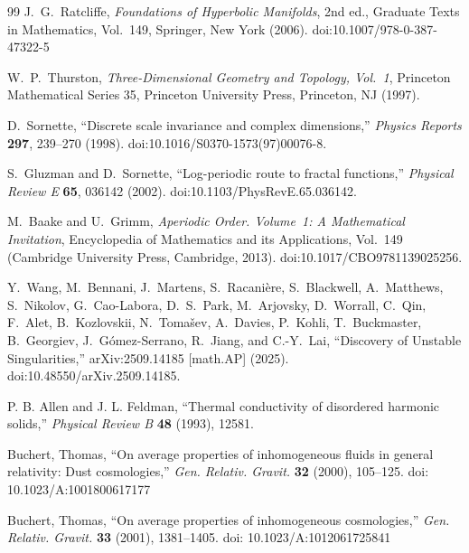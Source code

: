 \documentclass[10pt,reprint,aps,onecolumn,nofootinbib]{revtex4-2}
\begin{document}
\begin{thebibliography}{99}
    J.~G.~Ratcliffe,
    \textit{Foundations of Hyperbolic Manifolds}, 2nd ed.,
    Graduate Texts in Mathematics, Vol.~149,
    Springer, New York (2006).
    doi:10.1007/978-0-387-47322-5

    W.~P.~Thurston,
    \textit{Three-Dimensional Geometry and Topology, Vol.~1},
    Princeton Mathematical Series 35,
    Princeton University Press, Princeton, NJ (1997).

    D.~Sornette,
    ``Discrete scale invariance and complex dimensions,''
    \emph{Physics Reports} \textbf{297}, 239--270 (1998).
    doi:10.1016/S0370-1573(97)00076-8.

    S.~Gluzman and D.~Sornette,
    ``Log-periodic route to fractal functions,''
    \emph{Physical Review E} \textbf{65}, 036142 (2002).
    doi:10.1103/PhysRevE.65.036142.

    M.~Baake and U.~Grimm,
    \emph{Aperiodic Order. Volume~1: A Mathematical Invitation},
    Encyclopedia of Mathematics and its Applications, Vol.~149
    (Cambridge University Press, Cambridge, 2013).
    doi:10.1017/CBO9781139025256.

    Y.~Wang, M.~Bennani, J.~Martens, S.~Racani\`ere, S.~Blackwell,
    A.~Matthews, S.~Nikolov, G.~Cao-Labora, D.~S.~Park, M.~Arjovsky,
    D.~Worrall, C.~Qin, F.~Alet, B.~Kozlovskii, N.~Toma\v{s}ev,
    A.~Davies, P.~Kohli, T.~Buckmaster, B.~Georgiev, J.~G\'omez-Serrano,
    R.~Jiang, and C.-Y.~Lai,
    ``Discovery of Unstable Singularities,''
    arXiv:2509.14185 [math.AP] (2025).
    doi:10.48550/arXiv.2509.14185.


    P. B. Allen and J. L. Feldman,
    ``Thermal conductivity of disordered harmonic solids,''
    \textit{Physical Review B}
    \textbf{48}
    (1993), 12581.


    Buchert, Thomas,
    ``On average properties of inhomogeneous fluids in general relativity: Dust cosmologies,''
    \textit{Gen. Relativ. Gravit.}
    \textbf{32}
    (2000), 105--125.
    doi: 10.1023/A:1001800617177

    Buchert, Thomas,
    ``On average properties of inhomogeneous cosmologies,''
    \textit{Gen. Relativ. Gravit.}
    \textbf{33}
    (2001), 1381--1405.
    doi: 10.1023/A:1012061725841



\end{thebibliography}
\end{document}
